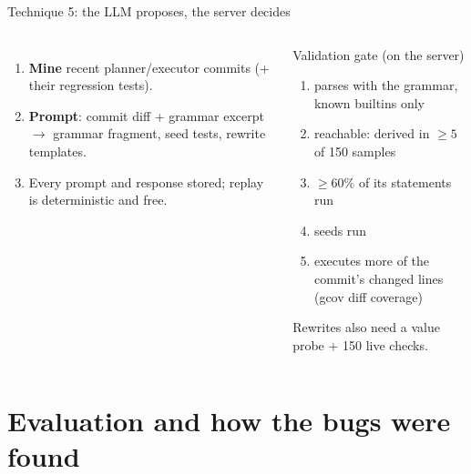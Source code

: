 \documentclass[aspectratio=169,10pt]{beamer}
\begin{document}
\begin{frame}{Technique 5: the LLM proposes, the server decides}
\small
\begin{columns}[T]
\begin{enumerate}
  \item \textbf{Mine} recent planner/executor commits (+ their regression tests).
  \item \textbf{Prompt}: commit diff + grammar excerpt $\rightarrow$ grammar \alert{fragment}, seed tests, rewrite templates.
  \item Every prompt and response stored; replay is deterministic and free.
\end{enumerate}
\begin{block}{Validation gate (on the server)}
\begin{enumerate}
  \item parses with the grammar, known builtins only
  \item reachable: derived in $\geq 5$ of 150 samples
  \item $\geq 60\%$ of its statements run
  \item seeds run
  \item executes more of the commit's \alert{changed lines} (gcov diff coverage)
\end{enumerate}
Rewrites also need a value probe + 150 live checks.
\end{block}
\end{columns}
\end{frame}

\section{Evaluation and how the bugs were found}
\end{document}
